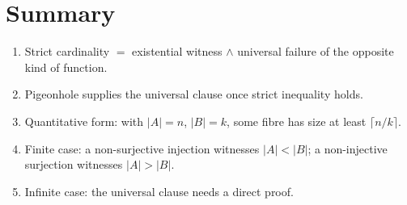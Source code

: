 \documentclass[11pt]{article}
\theoremstyle{defstyle}
\theoremstyle{thmstyle}
\theoremstyle{notstyle}
\theoremstyle{cautionstyle}
\newcommand{\card}[1]{\lvert #1 \rvert}
\begin{document}
\section{Summary}

\begin{enumerate}[leftmargin=2em, itemsep=2pt]
  \item Strict cardinality $=$ existential witness $\wedge$ universal failure
        of the opposite kind of function.
  \item Pigeonhole supplies the universal clause once strict inequality holds.
  \item Quantitative form: with $\card{A}=n$, $\card{B}=k$, some fibre has size
        at least $\lceil n/k \rceil$.
  \item Finite case: a non-surjective injection witnesses $\card{A} < \card{B}$;
        a non-injective surjection witnesses $\card{A} > \card{B}$.
  \item Infinite case: the universal clause needs a direct proof.
\end{enumerate}
\end{document}
